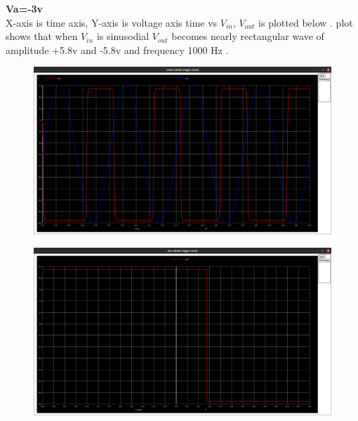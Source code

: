 \documentclass[12pt]{article}
\begin{document}
\textbf{Va=-3v\\}
X-axis is time axis, Y-axis is voltage axis time vs \(V_{in}\), \(V_{out}\) is plotted below . plot shows that when \(V_{in}\) is sinusodial \(V_{out}\) becomes nearly rectangular wave of amplitude +5.8v and -5.8v and frequency 1000 Hz .\\
\begin{figure}[h!]
\centering
\includegraphics[scale = 0.2]{q1_-3_sin.png}
\end{figure}
\newpage
\begin{figure}[h!]
\centering
\includegraphics[scale = 0.2]{q1_-3_dc.png}
\end{figure}
\newpage
\end{document}

